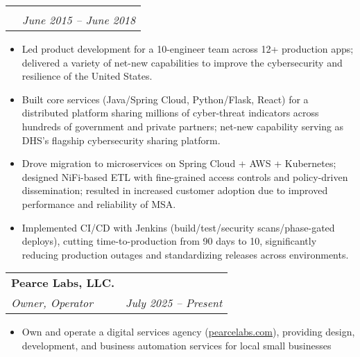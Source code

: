 \documentclass[letterpaper,11pt]{article}
\makeatletter
\newcommand{\resumeHeading}[3]{
  \begin{tabular*}{\textwidth}[t]{l@{\extracolsep{\fill}}r}
    \textbf{#1} & \\
    \color{lighter}\interlight\textit{\small#2} & \color{lighter}\interlight\textit{\small#3} \\
  \end{tabular*}
}
\newcommand{\resumeSubSubheading}[3]{
  \vspace{16pt}
  \begin{tabular*}{\textwidth}{l@{\extracolsep{\fill}}r}
    \intersemibold{#1} & \\
    \color{lighter}\interlight{\small#3} & \color{lighter}\interlight\textit{\small #2}\\
  \end{tabular*}
}
\newcommand{\resumeItemListStart}{
\begin{itemize}[leftmargin=20pt]}
\newcommand{\resumeItemListEnd}{
\end{itemize}}
\makeatother
\begin{document}
\resumeSubSubheading{Software Engineer, Technical Lead}{June 2015 -- June 2018}{CISA, Automated Indicator Sharing Platform}
\resumeItemListStart
\item Led product development for a 10-engineer team across 12+ production apps; delivered a variety of net-new capabilities to improve the cybersecurity and resilience of the United States.
\item Built core services (Java/Spring Cloud, Python/Flask, React) for a distributed platform sharing millions of cyber-threat indicators across hundreds of government and private partners; net-new capability serving as DHS's flagship cybersecurity sharing platform.
\item Drove migration to microservices on Spring Cloud + AWS + Kubernetes; designed NiFi-based ETL with fine-grained access controls and policy-driven dissemination; resulted in increased customer adoption due to improved performance and reliability of MSA.
\item Implemented CI/CD with Jenkins (build/test/security scans/phase-gated deploys), cutting time-to-production from 90 days to 10, significantly reducing production outages and standardizing releases across environments.
\resumeItemListEnd

\vspace{16pt}
\resumeHeading
{Pearce Labs, LLC.}
{Owner, Operator}{July 2025 -- Present}
\resumeItemListStart
\item Own and operate a digital services agency (\href{https://pearcelabs.com}{pearcelabs.com}), providing design, development, and business automation services for local small businesses
\resumeItemListEnd

\end{document}
